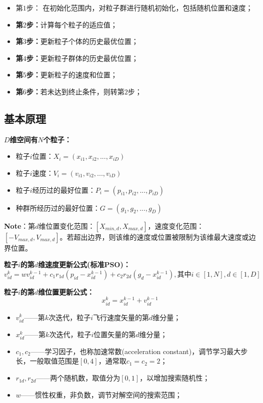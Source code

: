 \documentclass[UTF8]{ctexart}
\begin{document}
\begin{itemize}
    \item 第$1$步： 在初始化范围内，对粒子群进行随机初始化，包括随机位置和速度；
    \item \textbf{第$2$步：}计算每个粒子的适应值；
    \item \textbf{第$3$步：}更新粒子个体的历史最优位置；
    \item \textbf{第$4$步：}更新粒子群体的历史最优位置；
    \item \textbf{第$5$步：}更新粒子的速度和位置；
    \item \textbf{第$6$步：}若未达到终止条件，则转第$2$步；    
\end{itemize}

\subsection{基本原理}
\textbf{$D$维空间有$N$个粒子：}
\begin{itemize}
    \item 粒子$i$位置：$X_i = (x_{i1},x_{i2},...,x_{iD})$
    \item 粒子$i$速度：$V_i = (v_{i1},v_{i2},...,v_{iD})$
    \item 粒子$i$经历过的最好位置：$P_i = (p_{i1},p_{i2},...,p_{iD})$
    \item 种群所经历过的最好位置：$G = (g_1,g_2,...,g_D)$    
\end{itemize}

\textbf{Note}：第$d$维位置变化范围：$\left[X_{min,d},X_{max,d}\right]$，速度变化范围：$\left[-V_{max,d},V_{max,d}\right]$。若超出边界，则该维的速度或位置被限制为该维最大速度或边界位置。

\textbf{粒子$i$的第$d$维速度更新公式(标准PSO)：}
$$ v_{id}^{k}=wv_{id}^{k-1}+c_1r_{1d}\left(p_{id}-x_{id}^{k-1}\right)+c_2r_{2d}\left(g_d-x_{id}^{k-1}\right), 其中i \in [1,N], d \in [1,D] $$

\textbf{粒子$i$的第$d$维位置更新公式：}
$$ x_{id}^{k} = x_{id}^{k-1} + v_{id}^{k-1} $$
\begin{itemize}
    \item $v_{id}^{k}$——第$k$次迭代，粒子$i$飞行速度矢量的第$d$维分量；
    \item $x_{id}^{k}$——第$k$次迭代，粒子$i$位置矢量的第$d$维分量；
    \item $c_1,c_2$——学习因子，也称加速常数(acceleration constant)，调节学习最大步长，一般取值范围是$\left[0,4\right]$，通常取$c_1=c_2=2$；
    \item $r_{1d},r_{2d}$——两个随机数，取值分为$\left[0,1\right]$，以增加搜索随机性；
    \item $w$——惯性权重，非负数，调节对解空间的搜索范围；
\end{itemize}
\end{document}
